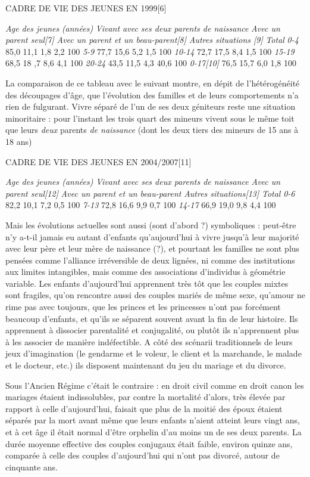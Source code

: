  
 CADRE DE VIE DES JEUNES EN 1999[6]
 
\emph{Age des jeunes}
\emph{ (années)}
\emph{Vivant avec ses deux parents de naissance}
\emph{Avec un parent seul[7]}
\emph{Avec un parent et un beau-parent[8]}
\emph{Autres situations [9]}
\emph{Total}
\emph{0-4}
85,0
11,1
1,8
2,2
100 %
\emph{5-9}
77,7
15,6
5,2
1,5
100 %
\emph{10-14}
72,7
17,5
8,4
1,5
100 %
\emph{15-19}
68,5
18 ,7
8,6
4,1
100 %
\emph{20-24}
43,5
11,5
4,3
40,6
100 %
\emph{0-17[10]}
76,5
15,7
6,0
1,8
100 %
 
 La comparaison de ce tableau avec le suivant montre, en dépit de l'hétérogénéité des découpages d'âge, que l'évolution des familles et de leurs comportements n'a rien de fulgurant. Vivre séparé de l'un de ses deux géniteurs reste une situation minoritaire : pour l'instant les trois quart des mineurs vivent sous le même toit que leurs\emph{ deux} parents\emph{ de naissanc}\emph{e} (dont les deux tiers des mineurs de 15 ans à 18 ans)
 
 CADRE DE VIE DES JEUNES EN 2004/2007[11]
 
\emph{Age des jeunes (années)}
\emph{Vivant avec ses deux parents de naissance}
\emph{Avec un parent seul[12]}
\emph{Avec un parent et un beau-parent}
\emph{Autres situations[13]}
\emph{Total}
\emph{0-6}
82,2
10,1
7,2
0,5
100%
\emph{7-13}
72,8
16,6
9,9
0,7
100%
\emph{14-17}
66,9
19,0
9,8
4,4
100%
 
 Mais les évolutions actuelles sont aussi (sont d'abord ?) symboliques : peut-être n'y a-t-il jamais eu autant d'enfants qu'aujourd'hui à vivre jusqu'à leur majorité avec leur père et leur mère de naissance (?), et pourtant les familles ne sont plus pensées comme l'alliance irréversible de deux lignées, ni comme des institutions aux limites intangibles, mais comme des associations d'individus à géométrie variable. Les enfants d'aujourd'hui apprennent très tôt que les couples mixtes sont fragiles, qu'on rencontre aussi des couples mariés de même sexe, qu'amour ne rime pas avec toujours, que les princes et les princesses n'ont pas forcément beaucoup d'enfants, et qu'ils se séparent souvent avant la fin de leur histoire. Ils apprennent à dissocier parentalité et conjugalité, ou plutôt ils n'apprennent plus à les associer de manière indéfectible. A côté des scénarii traditionnels de leurs jeux d'imagination (le gendarme et le voleur, le client et la marchande, le malade et le docteur, etc.) ils disposent maintenant du jeu du mariage et du divorce.

 Sous l'Ancien Régime c'était le contraire : en droit civil comme en droit canon les mariages étaient indissolubles, par contre la mortalité d'alors, très élevée par rapport à celle d'aujourd'hui, faisait que plus de la moitié des époux étaient séparés par la mort avant même que leurs enfants n'aient atteint leurs vingt ans, et à cet âge il était normal d'être orphelin d'au moins un de ses deux parents. La durée moyenne effective des couples conjugaux était faible, environ quinze ans, comparée à celle des couples d'aujourd'hui qui n'ont pas divorcé, autour de cinquante ans. 

